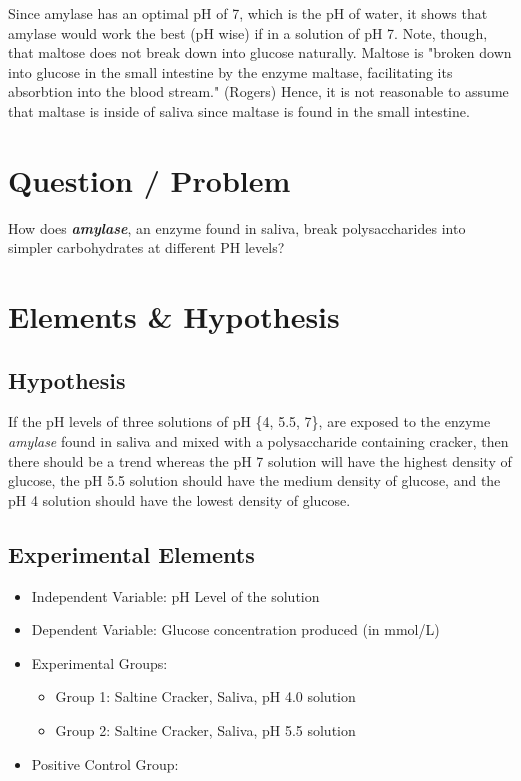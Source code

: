 \documentclass[letterpaper]{article}
\def\tightlist{}
\begin{document}
\begin{doublespace}
Since amylase has an optimal pH of 7, which is the pH of water, it shows that amylase would work the best (pH wise) if in a solution of pH 7. Note, though, that maltose does not break down into glucose naturally. Maltose is "broken down into glucose in the small intestine by the enzyme maltase, facilitating its absorbtion into the blood stream." (Rogers) Hence, it is not reasonable to assume that maltase is inside of saliva since maltase is found in the small intestine.

\section{Question / Problem}\label{question-problem}

How does \textbf{\emph{amylase}}, an enzyme found in saliva, break polysaccharides into simpler carbohydrates at different PH levels?

\section{Elements \& Hypothesis}\label{elements-hypothesis}

\subsection{Hypothesis}\label{hypothesis}

If the pH levels of three solutions of pH \{4, 5.5, 7\}, are exposed to the enzyme \emph{amylase} found in saliva and mixed with a polysaccharide containing cracker, then there should be a trend whereas the pH 7 solution will have the highest density of glucose, the pH 5.5 solution should have the medium density of glucose, and the pH 4 solution should have the lowest density of glucose.

\subsection{Experimental Elements}\label{experimental-elements}

\begin{itemize}
\tightlist
\item
  Independent Variable: pH Level of the solution
\item
  Dependent Variable: Glucose concentration produced (in mmol/L)
\item
  Experimental Groups:

  \begin{itemize}
  \tightlist
  \item
    Group 1: Saltine Cracker, Saliva, pH 4.0 solution
  \item
    Group 2: Saltine Cracker, Saliva, pH 5.5 solution
  \end{itemize}
\item
  Positive Control Group:


\end{itemize}
\end{doublespace}
\end{document}
